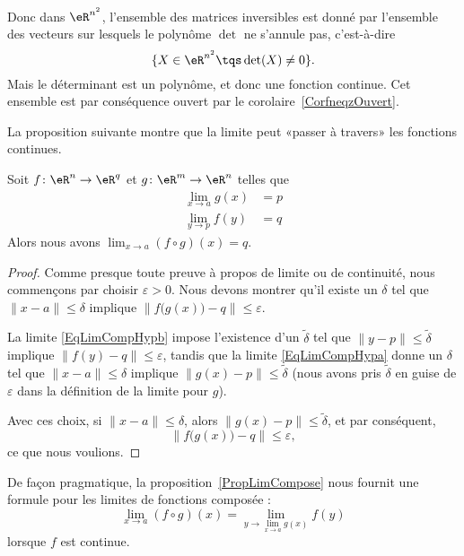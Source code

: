 \begin{example}
	Donc dans $\eR^{n^2}$, l'ensemble des matrices inversibles est donné par l'ensemble des vecteurs sur lesquels le polynôme $\det$ ne s'annule pas, c'est-à-dire
	\begin{equation}
		\{ X\in\eR^{n^2}\tqs \det(X)\neq 0 \}.
	\end{equation}
	Mais le déterminant est un polynôme, et donc une fonction continue. Cet ensemble est par conséquence ouvert par le corolaire~\ref{CorfneqzOuvert}.
\end{example}

La proposition suivante montre que la limite peut «passer à travers» les fonctions continues.
\begin{proposition}		\label{PropLimCompose}
	Soit $f\colon \eR^n\to \eR^q$ et $g\colon \eR^m\to \eR^n$ telles que
	\begin{subequations}
		\begin{align}
			\lim_{x\to a} g(x)&= p		\label{EqLimCompHypa}\\
			\lim_{y\to p} f(y)&= q		\label{EqLimCompHypb}
		\end{align}
	\end{subequations}
	Alors nous avons $\lim_{x\to a} (f\circ g)(x)=q$.
\end{proposition}

\begin{proof}
	Comme presque toute preuve à propos de limite ou de continuité, nous commençons par choisir $\varepsilon>0$. Nous devons montrer qu'il existe un $\delta$ tel que $\| x-a \|\leq \delta$ implique $\| f\big( g(x) \big)-q \|\leq \varepsilon$.

	La limite \eqref{EqLimCompHypb} impose l'existence d'un $\tilde\delta$ tel que $\| y-p \|\leq\tilde\delta$ implique $\| f(y)-q \|\leq\varepsilon$, tandis que la limite \eqref{EqLimCompHypa} donne un $\delta$ tel que $\| x-a \|\leq\delta$ implique $\| g(x)-p \|\leq\tilde\delta$ (nous avons pris $\tilde\delta$ en guise de $\varepsilon$ dans la définition de la limite pour $g$).

	Avec ces choix, si $\| x-a \|\leq \delta$, alors $\| g(x)-p \|\leq\tilde\delta$, et par conséquent,
	\begin{equation}
		\| f\big( g(x) \big)-q \|\leq\varepsilon,
	\end{equation}
	ce que nous voulions.
\end{proof}

De façon pragmatique, la proposition~\ref{PropLimCompose} nous fournit une formule pour les limites de fonctions composée :
\begin{equation}		\label{Eqlimfgvomp}
	\lim_{x\to a} (f\circ g)(x)=\lim_{y\to \lim_{x\to a} g(x)}f(y)
\end{equation}
lorsque $f$ est continue.

